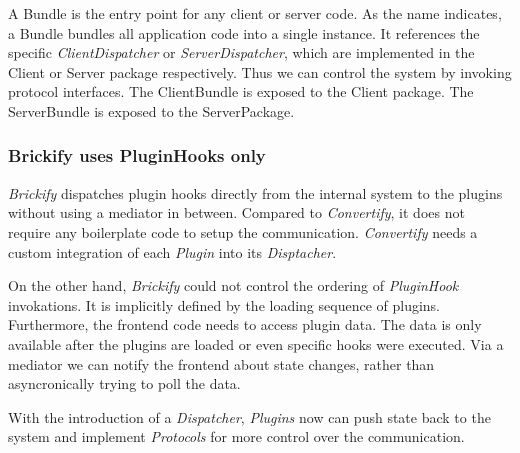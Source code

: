 \documentclass[../ClassicThesis.tex]{subfiles}
\begin{document}
A Bundle is the entry point for any client or server code. As the name
indicates, a Bundle bundles all application code into a single instance. It
references the specific \emph{ClientDispatcher} or \emph{ServerDispatcher},
which are implemented in the Client or Server package respectively. Thus we can
control the system by invoking protocol interfaces. The ClientBundle is exposed
to the Client package. The ServerBundle is exposed to the ServerPackage.

\subsubsection{Brickify uses PluginHooks only}

\emph{Brickify} dispatches plugin hooks directly from the internal system to the
plugins without using a mediator in between. Compared to \emph{Convertify}, it
does not require any boilerplate code to setup the communication.
\emph{Convertify} needs a custom integration of each \emph{Plugin} into its
\emph{Disptacher}.

On the other hand, \emph{Brickify} could not control the ordering of
\emph{PluginHook} invokations. It is implicitly defined by the loading sequence
of plugins. Furthermore, the frontend code needs to access plugin data. The data
is only available after the plugins are loaded or even specific hooks were
executed. Via a mediator we can notify the frontend about state changes, rather
than asyncronically trying to poll the data.

With the introduction of a \emph{Dispatcher}, \emph{Plugins} now can push state
back to the system and implement \emph{Protocols} for more control over the
communication.


\end{document}
